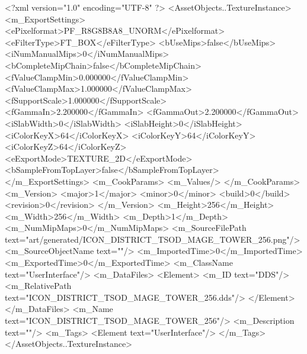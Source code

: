 <?xml version="1.0" encoding="UTF-8" ?>
<AssetObjects..TextureInstance>
	<m_ExportSettings>
		<ePixelformat>PF_R8G8B8A8_UNORM</ePixelformat>
		<eFilterType>FT_BOX</eFilterType>
		<bUseMips>false</bUseMips>
		<iNumManualMips>0</iNumManualMips>
		<bCompleteMipChain>false</bCompleteMipChain>
		<fValueClampMin>0.000000</fValueClampMin>
		<fValueClampMax>1.000000</fValueClampMax>
		<fSupportScale>1.000000</fSupportScale>
		<fGammaIn>2.200000</fGammaIn>
		<fGammaOut>2.200000</fGammaOut>
		<iSlabWidth>0</iSlabWidth>
		<iSlabHeight>0</iSlabHeight>
		<iColorKeyX>64</iColorKeyX>
		<iColorKeyY>64</iColorKeyY>
		<iColorKeyZ>64</iColorKeyZ>
		<eExportMode>TEXTURE_2D</eExportMode>
		<bSampleFromTopLayer>false</bSampleFromTopLayer>
	</m_ExportSettings>
	<m_CookParams>
		<m_Values/>
	</m_CookParams>
	<m_Version>
		<major>1</major>
		<minor>0</minor>
		<build>0</build>
		<revision>0</revision>
	</m_Version>
	<m_Height>256</m_Height>
	<m_Width>256</m_Width>
	<m_Depth>1</m_Depth>
	<m_NumMipMaps>0</m_NumMipMaps>
	<m_SourceFilePath text="art/generated/ICON_DISTRICT_TSOD_MAGE_TOWER_256.png"/>
	<m_SourceObjectName text=""/>
	<m_ImportedTime>0</m_ImportedTime>
	<m_ExportedTime>0</m_ExportedTime>
	<m_ClassName text="UserInterface"/>
	<m_DataFiles>
		<Element>
			<m_ID text="DDS"/>
			<m_RelativePath text="ICON_DISTRICT_TSOD_MAGE_TOWER_256.dds"/>
		</Element>
	</m_DataFiles>
	<m_Name text="ICON_DISTRICT_TSOD_MAGE_TOWER_256"/>
	<m_Description text=""/>
	<m_Tags>
		<Element text="UserInterface"/>
	</m_Tags>
</AssetObjects..TextureInstance>
